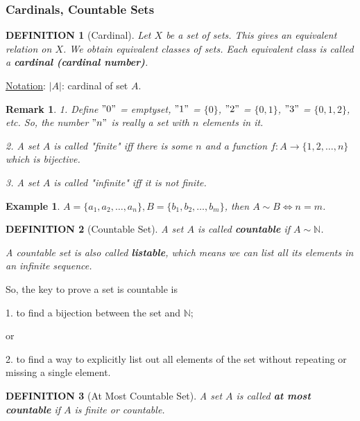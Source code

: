 \documentclass[12pt]{article}
\theoremstyle{blueplain}
\theoremstyle{bluedef}
\newtheorem{definition}{DEFINITION}[section]
\theoremstyle{blueremark}
\newtheorem{remark}{Remark}[section]
\newtheorem{example}{Example}[section]
\newcommand{\N}{\mathbb{N}}
\numberwithin{equation}{section}
\begin{document}
\subsubsection{Cardinals, Countable Sets}

\begin{definition}[Cardinal]

  Let $X$ be a set of sets. This gives an equivalent relation on $X$. We obtain equivalent classes of sets. Each equivalent class is called a \textbf{cardinal (cardinal number)}.
\end{definition}

\underline{Notation}: $|A|$: cardinal of set $A$.

\begin{remark}
  1. Define $"0"$ = emptyset, $"1"$ = $\{0\}$, $"2"$ = $\{0,1\}$, $"3"$ = $\{0,1,2\}$, etc. So, the number $"n"$ is really a set with $n$ elements in it.

  2. A set $A$ is called "finite" iff there is some $n$ and a function $f: A \rightarrow \{1, 2, \ldots, n\}$ which is bijective.

  3. A set $A$ is called "infinite" iff it is not finite.
\end{remark}

\begin{example}
  $A = \{a_1, a_2, \ldots, a_n\}, B = \{b_1, b_2, \ldots, b_m\}$, then $A \sim B \Leftrightarrow n = m$.
\end{example}

\begin{definition}[Countable Set]

  A set $A$ is called \textbf{countable} if $A \sim \N$.

  A countable set is also called \textbf{listable}, which means we can list all its elements in an infinite sequence.
\end{definition}

So, the key to prove a set is countable is

1. to find a bijection between the set and $\N$;

or

2. to find a way to explicitly list out all elements of the set without repeating or missing a single element.

\begin{definition}[At Most Countable Set]

  A set $A$ is called \textbf{at most countable} if $A$ is finite or countable.
\end{definition}
\end{document}
